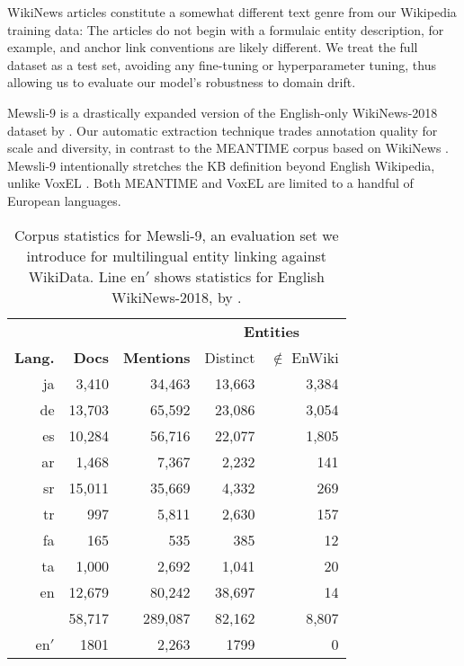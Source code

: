 \documentclass[11pt,a4paper]{article}
\begin{document}
WikiNews articles constitute a somewhat different text genre from our Wikipedia training data: The articles do not begin with a formulaic entity description, for example, and anchor link conventions are likely different. We treat the full dataset as a test set, avoiding any fine-tuning or hyperparameter tuning, thus allowing us to evaluate our model’s robustness to domain drift.

\mbox{Mewsli-9} is a drastically expanded version of the English-only WikiNews-2018 dataset by .
Our automatic extraction technique trades annotation quality for scale and diversity, in contrast to the MEANTIME corpus based on WikiNews \cite{minard-etal-2016-meantime}.
\mbox{Mewsli-9} intentionally stretches the KB definition beyond English Wikipedia, unlike VoxEL \cite{rosales2018voxel}.
Both MEANTIME and VoxEL are limited to a handful of European languages.


\begin{table}
\small
\centering
\begin{tabular}{rrrrr} \toprule
& & & \multicolumn{2}{c}{\textbf{Entities}} \\ \cmidrule(lr){4-5}
\textbf{Lang.} & \textbf{Docs} & \textbf{Mentions} & Distinct & $\notin$ EnWiki \\ \midrule
ja & 3,410 & 34,463 & 13,663 & 3,384 \\
de & 13,703 & 65,592 & 23,086 & 3,054 \\
es & 10,284 & 56,716 & 22,077 & 1,805 \\
ar & 1,468 & 7,367 & 2,232 & 141 \\
sr & 15,011 & 35,669 & 4,332 & 269 \\
tr & 997 & 5,811 & 2,630 & 157 \\
fa & 165 & 535 & 385 & 12 \\
ta & 1,000 & 2,692 & 1,041 & 20 \\
en & 12,679 & 80,242 & 38,697 & 14 \\ \cmidrule(lr){2-5} 
   & 58,717 & 289,087 & 82,162 & 8,807 \\ \midrule 
en$'$  & 1801 & 2,263 & 1799 & 0  \\ \bottomrule
\end{tabular}
\caption{Corpus statistics for Mewsli-9, an evaluation set we introduce for multilingual entity linking against WikiData.
Line en$'$ shows statistics for English WikiNews-2018, by .
\label{tab:wn_corpus}}
\end{table}
\end{document}
